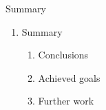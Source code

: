 \documentclass{beamer}
\begin{document}
\setcounter{enumi_chapter}{\value{enumi}}


\begin{frame}{Summary}

	\begin{enumerate}
		\setcounter{enumi}{\value{enumi_chapter}}

		\item Summary

			\begin{enumerate}
				\item Conclusions
				\item Achieved goals
				\item Further work
			\end{enumerate}

	\end{enumerate}

\end{frame}

\setcounter{enumi_chapter}{\value{enumi}}
\end{document}
